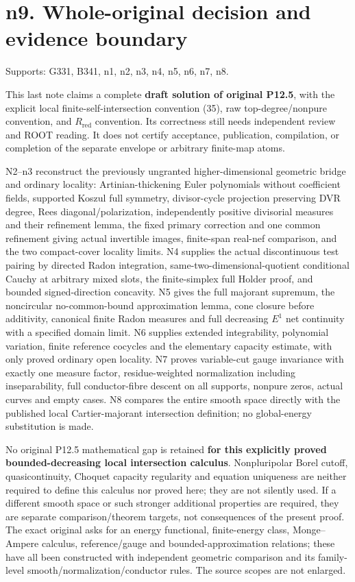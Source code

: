 \documentclass[
  11pt,
]{article}
\begin{document}
\section{n9. Whole-original decision and evidence
boundary}\label{n9.-whole-original-decision-and-evidence-boundary}

Supports: G331, B341, n1, n2, n3, n4, n5, n6, n7, n8.

This last note claims a complete \textbf{draft solution of original
P12.5}, with the explicit local finite-self-intersection convention
(35), raw top-degree/nonpure convention, and \(R_{\mathrm{red}}\)
convention. Its correctness still needs independent review and ROOT
reading. It does not certify acceptance, publication, compilation, or
completion of the separate envelope or arbitrary finite-map atoms.

N2--n3 reconstruct the previously ungranted higher-dimensional geometric
bridge and ordinary locality: Artinian-thickening Euler polynomials
without coefficient fields, supported Koszul full symmetry,
divisor-cycle projection preserving DVR degree, Rees
diagonal/polarization, independently positive divisorial measures and
their refinement lemma, the fixed primary correction and one common
refinement giving actual invertible images, finite-span real-nef
comparison, and the two compact-cover locality limits. N4 supplies the
actual discontinuous test pairing by directed Radon integration,
same-two-dimensional-quotient conditional Cauchy at arbitrary mixed
slots, the finite-simplex full Holder proof, and bounded
signed-direction concavity. N5 gives the full majorant supremum, the
noncircular no-common-bound approximation lemma, cone closure before
additivity, canonical finite Radon measures and full decreasing \(E^1\)
net continuity with a specified domain limit. N6 supplies extended
integrability, polynomial variation, finite reference cocycles and the
elementary capacity estimate, with only proved ordinary open locality.
N7 proves variable-cut gauge invariance with exactly one measure factor,
residue-weighted normalization including inseparability, full
conductor-fibre descent on all supports, nonpure zeros, actual curves
and empty cases. N8 compares the entire smooth space directly with the
published local Cartier-majorant intersection definition; no
global-energy substitution is made.

No original P12.5 mathematical gap is retained \textbf{for this
explicitly proved bounded-decreasing local intersection calculus}.
Nonpluripolar Borel cutoff, quasicontinuity, Choquet capacity regularity
and equation uniqueness are neither required to define this calculus nor
proved here; they are not silently used. If a different smooth space or
such stronger additional properties are required, they are separate
comparison/theorem targets, not consequences of the present proof. The
exact original asks for an energy functional, finite-energy class,
Monge--Ampere calculus, reference/gauge and bounded-approximation
relations; these have all been constructed with independent geometric
comparison and its family-level smooth/normalization/conductor rules.
The source scopes are not enlarged.
\end{document}
